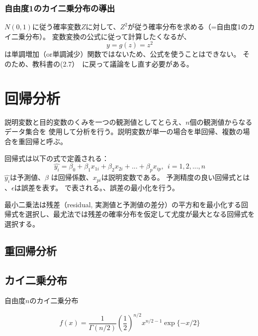 \documentclass[a4j,12pt]{jreport}
\begin{document}
\subsection{自由度1のカイ二乗分布の導出}

$N(0,1)$に従う確率変数$Z$に対して、$Z^2$が従う確率分布を求める（=自由度1のカイ二乗分布）。
変数変換の公式に従って計算したくなるが、
 \begin{equation}
   y = g(z) = z^2
 \end{equation}
 は単調増加（or単調減少）関数ではないため、公式を使うことはできない。
 そのため、教科書の(2.7）　に戻って議論をし直す必要がある。


















\chapter{回帰分析}

説明変数と目的変数のくみを一つの観測値としてとらえ、$n$個の観測値からなるデータ集合を
使用して分析を行う。説明変数が単一の場合を単回帰、複数の場合を重回帰と呼ぶ。

回帰式は以下の式で定義される：
\begin{equation}
  \hat{y_i} = \beta_0+\beta_1x_{1i}+\beta_2x_{2i}+ ... +  \beta_px_{ip},~~i=1,2,...,n
\end{equation}
$\hat{y_i}$は予測値、$\beta$ は回帰係数、$x_{pi}$は説明変数である。
予測精度の良い回帰式とは
、$\epsilon$は誤差を表す。
で表される。、誤差の最小化を行う。

最小二乗法は残差（residual, 実測値と予測値の差分）の平方和を最小化する回帰式を選択し、最尤法では残差の確率分布を仮定して尤度が最大となる回帰式を選択する。


\section{重回帰分析}



\section{カイ二乗分布}

自由度$n$のカイ二乗分布

\begin{equation}
  f(x) = \frac{1}{\Gamma (n/2)}\left(\frac{1}{2}\right)^{n/2} x^{n/2-1}\exp\{-x/2\}
\end{equation}
\end{document}
